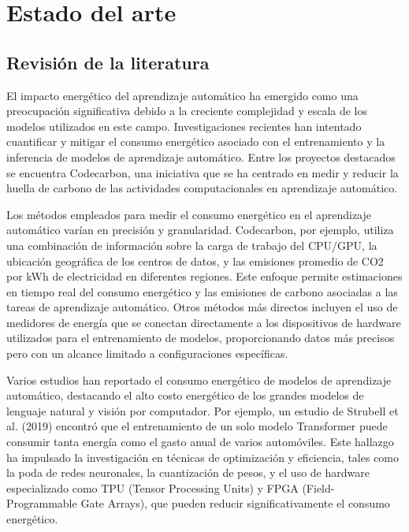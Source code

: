 \chapter{Estado del arte}
\label{chap:sota}

\section{Revisión de la literatura}
\label{sec:lit-rev}


El impacto energético del aprendizaje automático ha emergido como una preocupación significativa debido a la creciente complejidad y escala de los modelos utilizados en este campo. Investigaciones recientes han intentado cuantificar y mitigar el consumo energético asociado con el entrenamiento y la inferencia de modelos de aprendizaje automático. Entre los proyectos destacados se encuentra Codecarbon, una iniciativa que se ha centrado en medir y reducir la huella de carbono de las actividades computacionales en aprendizaje automático.

Los métodos empleados para medir el consumo energético en el aprendizaje automático varían en precisión y granularidad. Codecarbon, por ejemplo, utiliza una combinación de información sobre la carga de trabajo del CPU/GPU, la ubicación geográfica de los centros de datos, y las emisiones promedio de CO2 por kWh de electricidad en diferentes regiones. Este enfoque permite estimaciones en tiempo real del consumo energético y las emisiones de carbono asociadas a las tareas de aprendizaje automático. Otros métodos más directos incluyen el uso de medidores de energía que se conectan directamente a los dispositivos de hardware utilizados para el entrenamiento de modelos, proporcionando datos más precisos pero con un alcance limitado a configuraciones específicas.

Varios estudios han reportado el consumo energético de modelos de aprendizaje automático, destacando el alto costo energético de los grandes modelos de lenguaje natural y visión por computador. Por ejemplo, un estudio de Strubell et al. (2019) encontró que el entrenamiento de un solo modelo Transformer puede consumir tanta energía como el gasto anual de varios automóviles. Este hallazgo ha impulsado la investigación en técnicas de optimización y eficiencia, tales como la poda de redes neuronales, la cuantización de pesos, y el uso de hardware especializado como TPU (Tensor Processing Units) y FPGA (Field-Programmable Gate Arrays), que pueden reducir significativamente el consumo energético.


